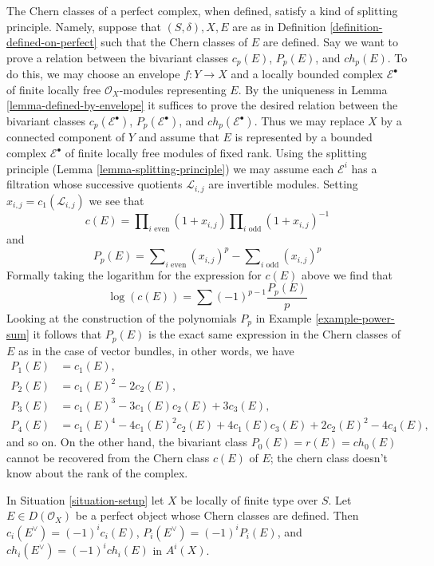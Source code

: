 \begin{remark}
\label{remark-splitting-principle-perfect}
The Chern classes of a perfect complex, when defined, satisfy a kind of
splitting principle. Namely, suppose that $(S, \delta), X, E$ are as in
Definition \ref{definition-defined-on-perfect}
such that the Chern classes of $E$ are defined.
Say we want to prove a relation between the bivariant classes
$c_p(E)$, $P_p(E)$, and $ch_p(E)$. To do this, we may choose an
envelope $f : Y \to X$ and a locally bounded
complex $\mathcal{E}^\bullet$ of finite locally free $\mathcal{O}_X$-modules
representing $E$. By the uniqueness in Lemma \ref{lemma-defined-by-envelope}
it suffices to prove the desired relation between the bivariant classes
$c_p(\mathcal{E}^\bullet)$, $P_p(\mathcal{E}^\bullet)$, and
$ch_p(\mathcal{E}^\bullet)$. Thus we may replace $X$ by a connected
component of $Y$ and assume that $E$ is represented by a bounded
complex $\mathcal{E}^\bullet$ of finite locally free modules of fixed rank.
Using the splitting principle
(Lemma \ref{lemma-splitting-principle}) we may assume each
$\mathcal{E}^i$ has a filtration whose successive
quotients $\mathcal{L}_{i, j}$ are invertible modules.
Setting $x_{i, j} = c_1(\mathcal{L}_{i, j})$ we see that
$$
c(E) =
\prod\nolimits_{i\text{ even}} (1 + x_{i, j})
\prod\nolimits_{i\text{ odd}} (1 + x_{i, j})^{-1}
$$
and
$$
P_p(E) =  \sum\nolimits_{i\text{ even}} (x_{i, j})^p -
\sum\nolimits_{i\text{ odd}} (x_{i, j})^p
$$
Formally taking the logarithm for the expression for $c(E)$ above
we find that
$$
\log(c(E)) = \sum (-1)^{p - 1}\frac{P_p(E)}{p}
$$
Looking at the construction of the polynomials $P_p$ in
Example \ref{example-power-sum} it follows that $P_p(E)$
is the exact same expression in the Chern classes of $E$
as in the case of vector bundles, in other words, we have
\begin{align*}
P_1(E) & = c_1(E), \\
P_2(E) & = c_1(E)^2 - 2c_2(E), \\
P_3(E) & = c_1(E)^3 - 3c_1(E)c_2(E) + 3c_3(E), \\
P_4(E) & = c_1(E)^4 - 4c_1(E)^2c_2(E) + 4c_1(E)c_3(E) + 2c_2(E)^2 - 4c_4(E),
\end{align*}
and so on. On the other hand, the bivariant class $P_0(E) = r(E) = ch_0(E)$
cannot be recovered from the Chern class $c(E)$ of $E$; the chern class
doesn't know about the rank of the complex.
\end{remark}

\begin{lemma}
\label{lemma-chern-classes-perfect-dual}
In Situation \ref{situation-setup} let $X$ be locally of finite type over $S$.
Let $E \in D(\mathcal{O}_X)$ be a perfect object whose Chern classes are
defined. Then $c_i(E^\vee) = (-1)^i c_i(E)$, $P_i(E^\vee) = (-1)^iP_i(E)$,
and $ch_i(E^\vee) = (-1)^ich_i(E)$ in $A^i(X)$.
\end{lemma}

